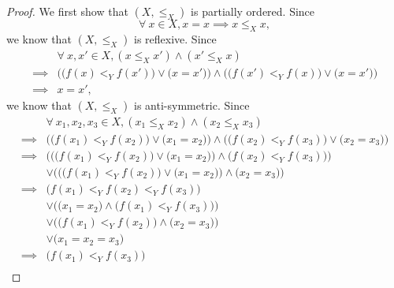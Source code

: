 \begin{proof}
    We first show that \((X, \leq_X)\) is partially ordered.
    Since
    \[
        \forall\ x \in X, x = x \implies x \leq_X x,
    \]
    we know that \((X, \leq_X)\) is reflexive.
    Since
    \begin{align*}
                 & \forall\ x, x' \in X, (x \leq_X x') \land (x' \leq_X x)                                                                 \\
        \implies & \Big(\big(f(x) <_Y f(x')\big) \lor \big(x = x'\big)\Big) \land \Big(\big(f(x') <_Y f(x)\big) \lor \big(x = x'\big)\Big) \\
        \implies & x = x',
    \end{align*}
    we know that \((X, \leq_X)\) is anti-symmetric.
    Since
    \begin{align*}
                 & \forall\ x_1, x_2, x_3 \in X, (x_1 \leq_X x_2) \land (x_2 \leq_X x_3)                                                               \\
        \implies & \Big(\big(f(x_1) <_Y f(x_2)\big) \lor \big(x_1 = x_2\big)\Big) \land \Big(\big(f(x_2) <_Y f(x_3)\big) \lor \big(x_2 = x_3\big)\Big) \\
        \implies & \bigg(\Big(\big(f(x_1) <_Y f(x_2)\big) \lor \big(x_1 = x_2\big)\Big) \land \big(f(x_2) <_Y f(x_3)\big)\bigg)                        \\
                 & \lor \bigg(\Big(\big(f(x_1) <_Y f(x_2)\big) \lor \big(x_1 = x_2\big)\Big) \land \big(x_2 = x_3\big)\bigg)                           \\
        \implies & \big(f(x_1) <_Y f(x_2) <_Y f(x_3)\big)                                                                                              \\
                 & \lor \Big(\big(x_1 = x_2\big) \land \big(f(x_1) <_Y f(x_3)\big)\Big)                                                                \\
                 & \lor \Big(\big(f(x_1) <_Y f(x_2)\big) \land \big(x_2 = x_3\big)\Big)                                                                \\
                 & \lor \big(x_1 = x_2 = x_3\big)                                                                                                      \\
        \implies & \big(f(x_1) <_Y f(x_3)\big)                                                                                                         \\

\end{align*}
\end{proof}
